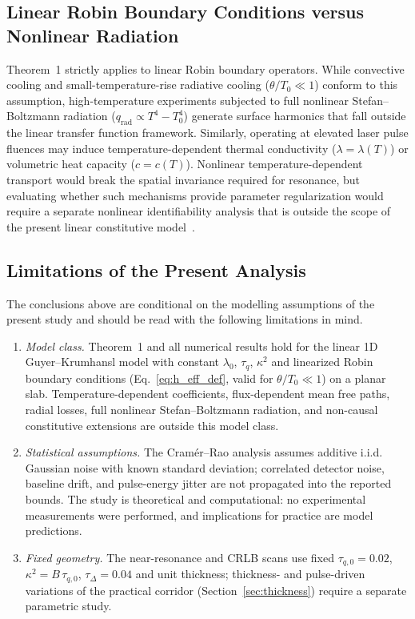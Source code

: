 \documentclass[preprint,12pt]{elsarticle}
\begin{document}
\subsection{Linear Robin Boundary Conditions versus Nonlinear Radiation}

Theorem~1 strictly applies to linear Robin boundary operators. While convective cooling and small-temperature-rise radiative cooling ($\theta / T_0 \ll 1$) conform to this assumption, high-temperature experiments subjected to full nonlinear Stefan--Boltzmann radiation ($q_{\mathrm{rad}} \propto T^4 - T_0^4$) generate surface harmonics that fall outside the linear transfer function framework. Similarly, operating at elevated laser pulse fluences may induce temperature-dependent thermal conductivity ($\lambda = \lambda(T)$) or volumetric heat capacity ($c = c(T)$). Nonlinear temperature-dependent transport would break the spatial invariance required for resonance, but evaluating whether such mechanisms provide parameter regularization would require a separate nonlinear identifiability analysis that is outside the scope of the present linear constitutive model~\cite{kovacs2020numerical,sellitto2025nonlinear,maillet2019review}.

\subsection{Limitations of the Present Analysis}
\label{sec:limitations}

The conclusions above are conditional on the modelling assumptions of the present study and should be read with the following limitations in mind.
\begin{enumerate}
    \item \textit{Model class.} Theorem~1 and all numerical results hold for the linear 1D Guyer--Krumhansl model with constant $\lambda_0$, $\tau_q$, $\kappa^2$ and linearized Robin boundary conditions (Eq.~\eqref{eq:h_eff_def}, valid for $\theta / T_0 \ll 1$) on a planar slab. Temperature-dependent coefficients, flux-dependent mean free paths, radial losses, full nonlinear Stefan--Boltzmann radiation, and non-causal constitutive extensions are outside this model class.
    \item \textit{Statistical assumptions.} The Cramér--Rao analysis assumes additive i.i.d. Gaussian noise with known standard deviation; correlated detector noise, baseline drift, and pulse-energy jitter are not propagated into the reported bounds. The study is theoretical and computational: no experimental measurements were performed, and implications for practice are model predictions.
    \item \textit{Fixed geometry.} The near-resonance and CRLB scans use fixed $\tau_{q,0} = 0.02$, $\kappa^2 = B\,\tau_{q,0}$, $\tau_\Delta = 0.04$ and unit thickness; thickness- and pulse-driven variations of the practical corridor (Section~\ref{sec:thickness}) require a separate parametric study.
\end{enumerate}
\end{document}
